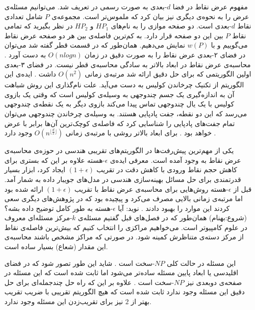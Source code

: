 مفهوم عرض نقاط در فضا $d$-بعدی به صورت رسمی در  تعریف شد. می‌توانیم مسئله‌ی عرض را به نحوه‌ی دیگری نیز بیان کرد که ملموس‌تر است.
 مجموعه‌ی $P$ شامل تعدادی نقاط $d$-بعدی است. دو صفحه موازی را به نام‌های $HP_1$ و $HP_2$ در نظر بگیرید که تمامی نقاط $P$ بین این دو صفحه قرار دارد. به کم‌ترین فاصله‌ی بین هر دو صفحه عرض نقاط می‌گوییم و با $w(P)$ نمایش می‌دهیم.
  همان‌طور که در قسمت قطر گفته شد می‌توان در فضای ۲-بعدی عرض نقاط را به صورت دقیق در زمان $O(n log n)$ به دست آورد . محاسبه‌ی عرض نقاط در ابعاد بالاتر به سادگی محاسبه‌ی قطر نیست. در فضای ۳-بعدی اولین الگوریتمی که برای حل دقیق ارائه شد مرتبه‌ی زمانی $O(n^2)$ داشت . ایده‌ی این الگوریتم از تکنیک چرخاندن کولیس  به دست می‌آید. علت نام‌گذاری این روش شباهت آن به اندازه‌گیری یک جسم چندوجهی به وسیله‌ی کولیس است که وقتی یک بازوی کولیس با یک یال چندوجهی تماس پیدا می‌کند بازوی دیگر به یک نقطه‌ی چندوجهی می‌رسد که این دو نقطه، جفت پادپایی  هستند. به وسیله‌ی چرخاندن چندوجهی می‌توان تمام جفت‌های پادپایی را شناسایی کرد که فاصله‌ی کوچک‌ترین آن‌ها برابر با عرض خواهد بود . برای ابعاد بالاتر روشی با مرتبه‌ی زمانی
   $O(n^{\lfloor \frac{d}{2} \rfloor})$
وجود دارد .

یکی از مهم‌ترین پیش‌رفت‌ها در الگوریتم‌های تقریبی هندسی در حوزه‌ی محاسبه‌ی عرض نقاط به وجود آمده است. معرفی ایده‌ی $\epsilon$-هسته علاوه بر این که بستری برای کاهش حجم نقاط ورودی با کاهش دقت در تقریب $(1+ \epsilon)$ ایجاد کرد، ابزار بسیار قدرتمندی برای حل مسائل بهینه‌سازی هندسی در مدل‌های جویبار داده به شمار آمد. قبل از $\epsilon$-هسته روش‌هایی برای محاسبه‌ی عرض نقاط با تقریب  $(1+ \epsilon)$  ارائه شده بود  اما مرتبه‌ی زمانی بالایی مصرف می‌کرد و پیچیده بود که در پژوهش‌های دیگری سعی کردند این موارد را بهبود دادند . 
نوید: آيا $\epsilon$-هسته به طور کامل توضیح داده بشه؟
(شروع:بهنام)
همان‌طور که در فصل‌های قبل گفتیم مسئله‌ی $k$-مرکز مسئله‌ای معروف در علوم کامپیوتر است. می‌خواهیم مراکزی را انتخاب کنیم که بیش‌ترین فاصله‌ی نقاط از مرکز دسته‌ی متناظرش کمینه شود. در صورتی که مراکز مشخص باشند محاسبه‌ی این مقدار (شعاع) بسیار ساده است.

این مسئله در حالت کلی $NP$-سخت است . شاید این طور تصور شود که در فضای اقلیدسی یا ابعاد پایین مسئله ساده‌تر می‌شود اما ثابت شده است که این مسئله در صفحه‌ی دوبعدی نیز $NP$-سخت است . علاوه بر این که راه حل چندجمله‌ای برای حل دقیق این مسئله وجود ندارد ثابت شده است که هیچ الگوریتم تقریبی با ضریب تقریب بهتر از $2$ نیز برای تقریب‌زدن این مسئله وجود ندارد.

